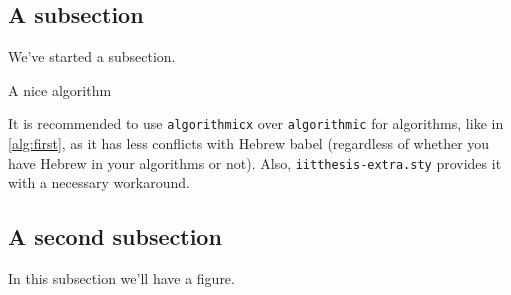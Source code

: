 \subsection{A subsection}

We've started a subsection.

\begin{algorithm}
\caption{A nice algorithm}
\label{alg:first}
\begin{algorithmic}[1]
\ENDFOR
{}
\end{algorithmic}
\end{algorithm}

It is recommended to use \texttt{algorithmicx} over \texttt{algorithmic} for algorithms, like in \autoref{alg:first}, as it has less conflicts with Hebrew babel (regardless of whether you have Hebrew in your algorithms or not). Also, \texttt{iitthesis-extra.sty} provides it with a necessary workaround.

\subsection{A second subsection}

In this subsection we'll have a figure.

